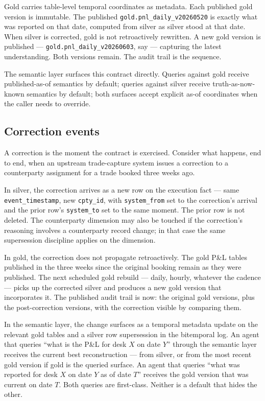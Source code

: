 \documentclass[11pt,a4paper]{article}
\begin{document}
Gold carries table-level temporal coordinates as metadata. Each published gold version is immutable. The published \texttt{gold.pnl\_daily\_v20260520} is exactly what was reported on that date, computed from silver as silver stood at that date. When silver is corrected, gold is not retroactively rewritten. A new gold version is published --- \texttt{gold.pnl\_daily\_v20260603}, say --- capturing the latest understanding. Both versions remain. The audit trail is the sequence.

The semantic layer surfaces this contract directly. Queries against gold receive published-as-of semantics by default; queries against silver receive truth-as-now-known semantics by default; both surfaces accept explicit as-of coordinates when the caller needs to override.

\subsection{Correction events}

A correction is the moment the contract is exercised. Consider what happens, end to end, when an upstream trade-capture system issues a correction to a counterparty assignment for a trade booked three weeks ago.

In silver, the correction arrives as a new row on the execution fact --- same \texttt{event\_timestamp}, new \texttt{cpty\_id}, with \texttt{system\_from} set to the correction's arrival and the prior row's \texttt{system\_to} set to the same moment. The prior row is not deleted. The counterparty dimension may also be touched if the correction's reasoning involves a counterparty record change; in that case the same supersession discipline applies on the dimension.

In gold, the correction does not propagate retroactively. The gold P\&L tables published in the three weeks since the original booking remain as they were published. The next scheduled gold rebuild --- daily, hourly, whatever the cadence --- picks up the corrected silver and produces a new gold version that incorporates it. The published audit trail is now: the original gold versions, plus the post-correction versions, with the correction visible by comparing them.

In the semantic layer, the change surfaces as a temporal metadata update on the relevant gold tables and a silver row supersession in the bitemporal log. An agent that queries ``what is the P\&L for desk $X$ on date $Y$'' through the semantic layer receives the current best reconstruction --- from silver, or from the most recent gold version if gold is the queried surface. An agent that queries ``what was reported for desk $X$ on date $Y$ as of date $T$'' receives the gold version that was current on date $T$. Both queries are first-class. Neither is a default that hides the other.
\end{document}
